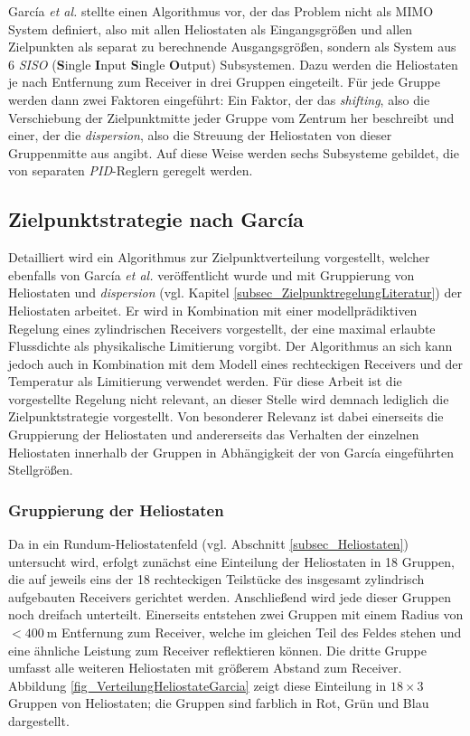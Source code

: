 García \textit{et al.} \cite{Garcia1} stellte einen Algorithmus vor, der das Problem nicht als MIMO System definiert, also mit allen Heliostaten als Eingangsgrößen und allen Zielpunkten als separat zu berechnende Ausgangsgrößen, sondern als System aus 6 \textit{SISO} (\textbf{S}ingle \textbf{I}nput \textbf{S}ingle \textbf{O}utput) Subsystemen.
Dazu werden die Heliostaten je nach Entfernung zum Receiver in drei Gruppen eingeteilt.
Für jede Gruppe werden dann zwei Faktoren eingeführt: Ein Faktor, der das \textit{shifting}, also die Verschiebung der Zielpunktmitte jeder Gruppe vom Zentrum her beschreibt und einer, der die \textit{dispersion}, also die Streuung der Heliostaten von dieser Gruppenmitte aus angibt.
Auf diese Weise werden sechs Subsysteme gebildet, die von separaten \textit{PID}-Reglern geregelt werden.


\subsection{Zielpunktstrategie nach García} \label{subsec_ZielpunktregelungGarcia}
Detailliert wird ein Algorithmus zur Zielpunktverteilung vorgestellt, welcher ebenfalls von García \textit{et al.} \cite{Garcia2} veröffentlicht wurde und mit Gruppierung von Heliostaten und \textit{dispersion} (vgl. Kapitel \ref{subsec_ZielpunktregelungLiteratur}) der Heliostaten arbeitet.
Er wird in Kombination mit einer modellprädiktiven Regelung eines zylindrischen Receivers vorgestellt, der eine maximal erlaubte Flussdichte als physikalische Limitierung vorgibt.
Der Algorithmus an sich kann jedoch auch in Kombination mit dem Modell eines rechteckigen Receivers und der Temperatur als Limitierung verwendet werden.
Für diese Arbeit ist die vorgestellte Regelung nicht relevant, an dieser Stelle wird demnach lediglich die Zielpunktstrategie vorgestellt.
Von besonderer Relevanz ist dabei einerseits die Gruppierung der Heliostaten und andererseits das Verhalten der einzelnen Heliostaten innerhalb der Gruppen in Abhängigkeit der von García eingeführten Stellgrößen.

\subsubsection*{Gruppierung der Heliostaten} \label{subsubsec_Gruppierung}
Da in \cite{Garcia2} ein Rundum-Heliostatenfeld (vgl. Abschnitt \ref{subsec_Heliostaten}) untersucht wird, erfolgt zunächst eine Einteilung der Heliostaten in 18 Gruppen, die auf jeweils eins der 18 rechteckigen Teilstücke des insgesamt zylindrisch aufgebauten Receivers gerichtet werden.
Anschließend wird jede dieser Gruppen noch dreifach unterteilt.
Einerseits entstehen zwei Gruppen mit einem Radius von $<\SI{400}{\metre}$ Entfernung zum Receiver, welche im gleichen Teil des Feldes stehen und eine ähnliche Leistung zum Receiver reflektieren können.
Die dritte Gruppe umfasst alle weiteren Heliostaten mit größerem Abstand zum Receiver. \cite[S.8-10]{Garcia2}\\
Abbildung \ref{fig_VerteilungHeliostateGarcia} zeigt diese Einteilung in $18 \times 3$ Gruppen von Heliostaten; die Gruppen sind farblich in Rot, Grün und Blau dargestellt.


